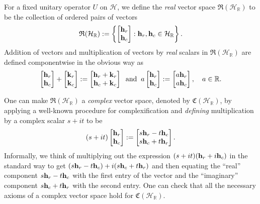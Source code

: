 \documentclass{dis}
\theoremstyle{plain}
\theoremstyle{definition}
\def\R{\mathbb{R}}
\renewcommand{\vec}[1]{{\bf #1}}
\newcommand{\0}{{\color{lightgray}0}}
\begin{document}
For a fixed unitary operator $U$ on $\mathcal{H}$, we define the {\em real} vector space $\mathfrak{R}(\mathcal{H}_{\R})$ to be the collection of ordered pairs of vectors
$$\mathfrak{R}(\mathcal{H}_{\R}) := \left\{\begin{bmatrix} \vec{h}_r\\ \vec{h}_c\end{bmatrix}: \vec{h}_r, \vec{h}_c \in \mathcal{H}_{\R}\right\}.$$
Addition of vectors and multiplication of vectors  by {\em real} scalars  in $\mathfrak{R}(\mathcal{H}_{\R})$ are defined componentwise in the obvious way as 
$$\begin{bmatrix} \vec{h}_r\\ \vec{h}_c\end{bmatrix} + \begin{bmatrix} \vec{k}_r\\ \vec{k}_c\end{bmatrix} := \begin{bmatrix} \vec{h}_r + \vec{k}_r\\ \vec{h}_c + \vec{k}_c\end{bmatrix} \; \; \mbox{and} \; \; a \begin{bmatrix} \vec{h}_r\\ \vec{h}_c\end{bmatrix} := \begin{bmatrix} a\vec{h}_r\\ a \vec{h}_c\end{bmatrix}, \quad a \in \R.$$

One can make $\mathfrak{R}(\mathcal{H}_{\R})$  a {\em complex} vector space, denoted by $\mathfrak{C}(\mathcal{H}_{\R})$, by applying a well-known procedure for complexification and  {\em defining} multiplication by a complex scalar $s + i t$ to be 
\begin{equation}\label{cdef}
(s + i t) \begin{bmatrix} \vec{h}_r\\ \vec{h}_c\end{bmatrix} := \begin{bmatrix} s \vec{h}_r - t \vec{h}_c\\ s \vec{h}_c + t \vec{h}_r\end{bmatrix}.
\end{equation}
Informally, we think of multiplying out the expression $(s + i t) (\vec{h}_r + i \vec{h}_c)$ in the standard way to get
$(s \vec{h}_r - t \vec{h}_c) + i(s \vec{h}_c + t \vec{h}_r)$ and then equating the ``real'' component $s \vec{h}_r - t \vec{h}_c$ with the first entry of the vector and the ``imaginary'' component $s \vec{h}_c + t \vec{h}_r$ with the second entry.
One can check that all the necessary axioms  of a complex vector space hold for $\mathfrak{C}(\mathcal{H}_{\R})$. 
\end{document}
